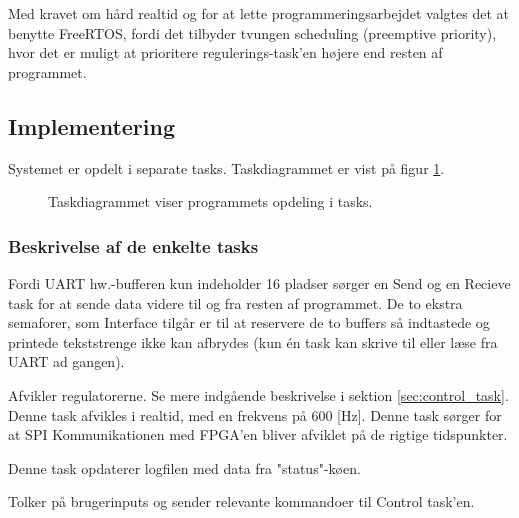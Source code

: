 Med kravet om hård realtid og for at lette programmeringsarbejdet valgtes det at
benytte FreeRTOS, fordi det tilbyder tvungen scheduling (preemptive priority), hvor det er muligt
at prioritere regulerings-task'en højere end resten af programmet.

%
\subsection{Implementering}
% 
% 
Systemet er opdelt i separate tasks.
Taskdiagrammet er vist på figur \ref{fig:task_diagram}. 

\begin{figure}[!h]
\centering
\begin{tikzpicture}[node distance = 3.2cm]
	
\end{tikzpicture}
\caption[Taskdiagram]{Taskdiagrammet viser programmets opdeling i tasks.}
\label{fig:task_diagram}
\end{figure}

\subsubsection{Beskrivelse af de enkelte tasks}
\begin{description}
\itemsep-3pt
	\item[UART send og -receive] Fordi UART hw.-bufferen kun indeholder 16 pladser \citep[s. 430]{lm3s6965}
	sørger en Send og en Recieve task for at sende data videre til og fra resten af programmet.
	De to ekstra semaforer, som Interface tilgår er til at reservere de to buffers så indtastede og
	printede tekststrenge ikke kan afbrydes (kun én task kan skrive til eller læse fra UART ad gangen).
	\item[Control] Afvikler regulatorerne. Se mere indgående beskrivelse i sektion \ref{sec:control_task}.
	Denne task afvikles i realtid, med en frekvens på 600 [Hz]. 
	Denne task sørger for at SPI Kommunikationen med FPGA'en bliver afviklet på de rigtige tidspunkter.
	\item[Logger] Denne task opdaterer logfilen med data fra "status"-køen.
	\item[Interface] Tolker på brugerinputs og sender relevante kommandoer til Control task'en.
\end{description}


